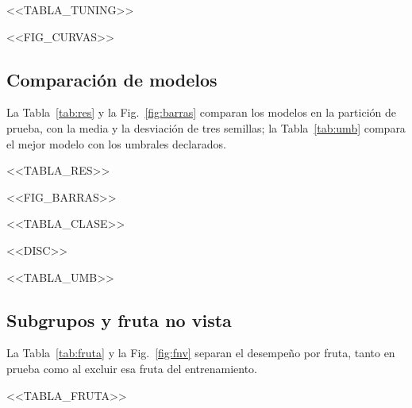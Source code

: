 \documentclass[10pt,twocolumn,letterpaper]{article}
\begin{document}
\begin{table}[t]\centering\footnotesize{}\caption{Búsqueda de hiperparámetros en validación (semilla 42).}\label{tab:tun}
\setlength{\tabcolsep}{3pt}<<TABLA_TUNING>>\end{table}

<<FIG_CURVAS>>

\subsection{Comparación de modelos}
La Tabla~\ref{tab:res} y la Fig.~\ref{fig:barras} comparan los modelos en la partición de prueba, con la media y la desviación de tres semillas; la Tabla~\ref{tab:umb} compara el mejor modelo con los umbrales declarados.

\begin{table}[t]\centering\footnotesize{}\caption{Resultados en prueba (media $\pm$ desviación, 3 semillas).}\label{tab:res}
\setlength{\tabcolsep}{3pt}<<TABLA_RES>>\end{table}

<<FIG_BARRAS>>

\begin{table}[t]\centering\footnotesize{}\caption{Precisión, recall y F1 por clase en prueba (media de 3 semillas).}\label{tab:clase}
\setlength{\tabcolsep}{3pt}<<TABLA_CLASE>>\end{table}

<<DISC>>

\begin{table}[t]\centering\footnotesize{}\caption{Umbrales declarados y resultado del mejor modelo.}\label{tab:umb}
\setlength{\tabcolsep}{3pt}<<TABLA_UMB>>\end{table}

\subsection{Subgrupos y fruta no vista}
La Tabla~\ref{tab:fruta} y la Fig.~\ref{fig:fnv} separan el desempeño por fruta, tanto en prueba como al excluir esa fruta del entrenamiento.

\begin{table}[t]\centering\footnotesize{}\caption{Macro-F1 por fruta (media de 3 semillas).}\label{tab:fruta}
\setlength{\tabcolsep}{3pt}<<TABLA_FRUTA>>\end{table}
\end{document}
